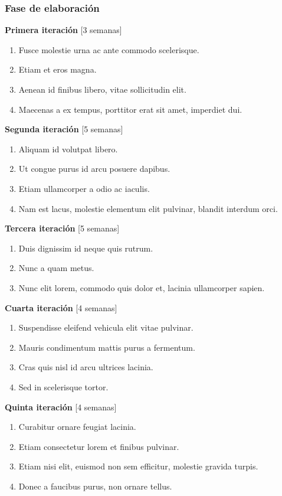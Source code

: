 \documentclass[a4paper, 10pt, twoside]{article}
\begin{document}
\subsubsection{Fase de elaboración}

\textbf{Primera iteración} [3 semanas]
\begin{enumerate}
\item Fusce molestie urna ac ante commodo scelerisque.
\item Etiam et eros magna.
\item Aenean id finibus libero, vitae sollicitudin elit.
\item Maecenas a ex tempus, porttitor erat sit amet, imperdiet dui.
\end{enumerate}

\textbf{Segunda iteración} [5 semanas]
\begin{enumerate}
\item Aliquam id volutpat libero.
\item Ut congue purus id arcu posuere dapibus.
\item Etiam ullamcorper a odio ac iaculis.
\item Nam est lacus, molestie elementum elit pulvinar, blandit interdum orci.
\end{enumerate}

\textbf{Tercera iteración} [5 semanas]
\begin{enumerate}
\item Duis dignissim id neque quis rutrum.
\item Nunc a quam metus.
\item Nunc elit lorem, commodo quis dolor et, lacinia ullamcorper sapien.
\end{enumerate}

\textbf{Cuarta iteración} [4 semanas]
\begin{enumerate}
\item Suspendisse eleifend vehicula elit vitae pulvinar.
\item Mauris condimentum mattis purus a fermentum.
\item Cras quis nisl id arcu ultrices lacinia.
\item Sed in scelerisque tortor.
\end{enumerate}

\textbf{Quinta iteración} [4 semanas]
\begin{enumerate}
\item Curabitur ornare feugiat lacinia.
\item Etiam consectetur lorem et finibus pulvinar.
\item Etiam nisi elit, euismod non sem efficitur, molestie gravida turpis.
\item Donec a faucibus purus, non ornare tellus.
\end{enumerate}
\end{document}
